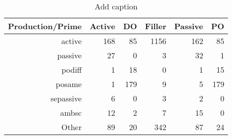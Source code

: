 \begin{table}[htbp]
  \centering
  \caption{Add caption}
    \begin{tabular}{rrrrrr}
    \toprule
    Production/Prime & Active & DO    & Filler & Passive & PO \\
    \midrule
    active & 168   & 85    & 1156  & 162   & 85 \\
    passive & 27    & 0     & 3     & 32    & 1 \\
    podiff & 1     & 18    & 0     & 1     & 15 \\
    posame & 1     & 179   & 9     & 5     & 179 \\
    sepassive & 6     & 0     & 3     & 2     & 0 \\
    ambsc & 12    & 2     & 7     & 15    & 0 \\
    Other & 89    & 20    & 342   & 87    & 24 \\
    \bottomrule
    \end{tabular}%
  \label{tab:addlabel}%
\end{table}%
